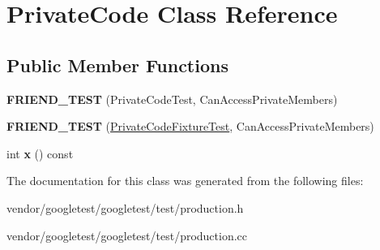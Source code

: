 \hypertarget{class_private_code}{}\section{Private\+Code Class Reference}
\label{class_private_code}
\subsection*{Public Member Functions}
\begin{DoxyCompactItemize}
\item 
\mbox{\label{class_private_code_a9a74a333501232539ab1636f0928d8f2}} 
{\bfseries F\+R\+I\+E\+N\+D\+\_\+\+T\+E\+ST} (Private\+Code\+Test, Can\+Access\+Private\+Members)
\item 
\mbox{\label{class_private_code_a29b6823300f68d78691476eeeaed8a7c}} 
{\bfseries F\+R\+I\+E\+N\+D\+\_\+\+T\+E\+ST} (\hyperlink{classtesting_1_1_test}{Private\+Code\+Fixture\+Test}, Can\+Access\+Private\+Members)
\item 
\mbox{\label{class_private_code_a247781246ce4d0c66563eaa39ba5aaa9}} 
int {\bfseries x} () const
\end{DoxyCompactItemize}


The documentation for this class was generated from the following files\+:\begin{DoxyCompactItemize}
\item 
vendor/googletest/googletest/test/production.\+h\item 
vendor/googletest/googletest/test/production.\+cc\end{DoxyCompactItemize}
